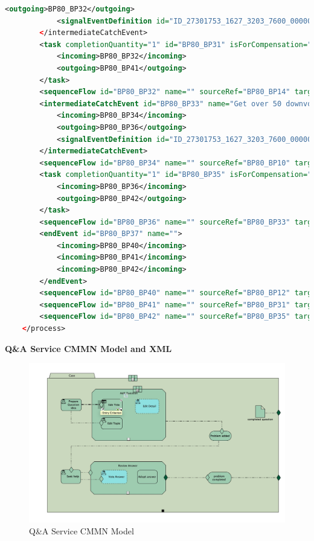 \documentclass[runningheads]{llncs}
\begin{document}
\begin{lstlisting}[language={XML}]
			<outgoing>BP80_BP32</outgoing>
			<signalEventDefinition id="ID_27301753_1627_3203_7600_000000200122" />
		</intermediateCatchEvent>
		<task completionQuantity="1" id="BP80_BP31" isForCompensation="false" name="Receive award" startQuantity="1">
			<incoming>BP80_BP32</incoming>
			<outgoing>BP80_BP41</outgoing>
		</task>
		<sequenceFlow id="BP80_BP32" name="" sourceRef="BP80_BP14" targetRef="BP80_BP31" />
		<intermediateCatchEvent id="BP80_BP33" name="Get over 50 downvoted">
			<incoming>BP80_BP34</incoming>
			<outgoing>BP80_BP36</outgoing>
			<signalEventDefinition id="ID_27301753_1627_3203_7600_000000200123" />
		</intermediateCatchEvent>
		<sequenceFlow id="BP80_BP34" name="" sourceRef="BP80_BP10" targetRef="BP80_BP33" />
		<task completionQuantity="1" id="BP80_BP35" isForCompensation="false" name="Edit answer" startQuantity="1">
			<incoming>BP80_BP36</incoming>
			<outgoing>BP80_BP42</outgoing>
		</task>
		<sequenceFlow id="BP80_BP36" name="" sourceRef="BP80_BP33" targetRef="BP80_BP35" />
		<endEvent id="BP80_BP37" name="">
			<incoming>BP80_BP40</incoming>
			<incoming>BP80_BP41</incoming>
			<incoming>BP80_BP42</incoming>
		</endEvent>
		<sequenceFlow id="BP80_BP40" name="" sourceRef="BP80_BP12" targetRef="BP80_BP37" />
		<sequenceFlow id="BP80_BP41" name="" sourceRef="BP80_BP31" targetRef="BP80_BP37" />
		<sequenceFlow id="BP80_BP42" name="" sourceRef="BP80_BP35" targetRef="BP80_BP37" />
	</process>
	\end{lstlisting}

	\textbf{Q\&A Service CMMN Model and XML}\\
	\begin{figure}
		\centering %
		\includegraphics[width=1.0\textwidth]{cmmnmodel} %
		\caption{Q\&A Service CMMN Model} %
		\label{qaservice} %
    \end{figure}   
    
    
    

	\clearpage
\end{document}
